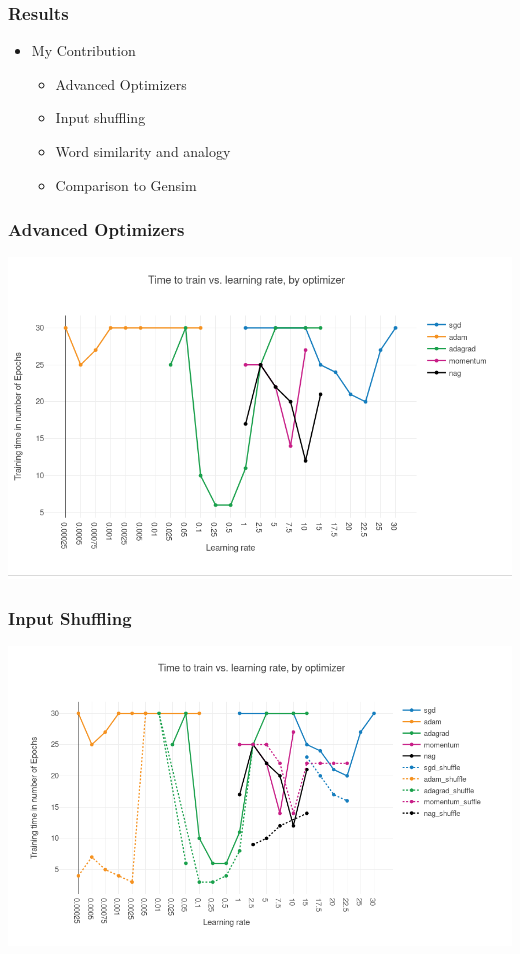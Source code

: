 \begin{frame}\frametitle{Results}
\begin{itemize}
\item My Contribution
\begin{itemize}
\item Advanced Optimizers
\item Input shuffling
\item Word similarity and analogy
\item Comparison to Gensim
\end{itemize}
\end{itemize}
\end{frame}
\begin{frame}
\frametitle{Advanced Optimizers}
\includegraphics[scale=0.4]{images/results_optim}
\end{frame}
\begin{frame}
\frametitle{Input Shuffling}
\includegraphics[scale=0.4]{images/results_shuffle}
\end{frame}